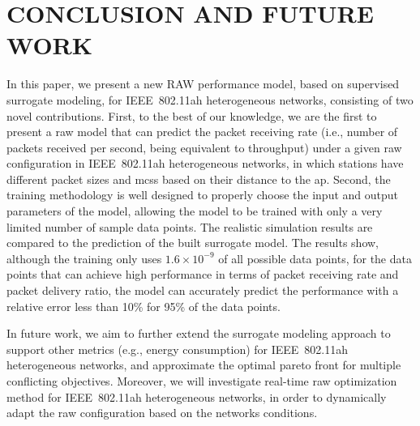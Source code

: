 \section{CONCLUSION AND FUTURE WORK \label{sec:conclusion}}

In this paper, we present a new RAW performance model, based on supervised surrogate modeling, for IEEE~802.11ah heterogeneous networks, consisting of
two novel contributions. First, to the best of our knowledge, we are the first to present a \gls{raw} model that can predict the packet receiving rate (i.e., number of packets received per second, being equivalent to throughput) under a given \gls{raw} configuration in IEEE~802.11ah heterogeneous networks, in which stations have different packet sizes and \gls{mcs}s based on their distance to the \gls{ap}. Second, the training methodology is well designed to properly choose the input and output parameters of the model, allowing the model to be trained with only a very limited number of sample data points. The realistic simulation results are compared to the prediction of the built surrogate model. The results show, although the training only uses $1.6 \times 10^{-9}$ of all possible data points, for the data points that can achieve high performance in terms of packet receiving rate and packet delivery ratio,  the model can accurately predict the performance with a relative error less than 10\% for 95\% of the data points. 

In future work, we aim to further extend the surrogate modeling approach to support other metrics (e.g., energy consumption) for IEEE~802.11ah heterogeneous networks, and approximate the optimal pareto front for multiple conflicting objectives. Moreover, we will investigate real-time \gls{raw} optimization method for IEEE~802.11ah heterogeneous networks, in order to dynamically adapt the \gls{raw} configuration based on the networks conditions.   





 




